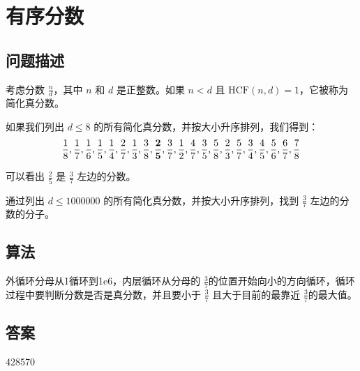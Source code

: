 \section{有序分数}\label{sec:problem71}
\subsection{问题描述}
\begin{tcolorbox}
考虑分数 \( \frac{n}{d} \)，其中 \( n \) 和 \( d \) 是正整数。如果 \( n < d \) 且 \( \text{HCF}(n, d) = 1 \)，它被称为简化真分数。

如果我们列出 \( d \leq 8 \) 的所有简化真分数，并按大小升序排列，我们得到：
\[ \frac{1}{8}, \frac{1}{7}, \frac{1}{6}, \frac{1}{5}, \frac{1}{4}, \frac{2}{7}, \frac{1}{3}, \frac{3}{8}, \frac{\bf
2}{\bf 5}, \frac{3}{7}, \frac{1}{2}, \frac{4}{7}, \frac{3}{5}, \frac{5}{8}, \frac{2}{3}, \frac{5}{7}, \frac{3}{4}, \frac{4}{5}, \frac{5}{6}, \frac{6}{7}, \frac{7}{8} \]

可以看出 \( \frac{2}{5} \) 是 \( \frac{3}{7} \) 左边的分数。

通过列出 \( d \leq 1000000 \) 的所有简化真分数，并按大小升序排列，找到 \( \frac{3}{7} \) 左边的分数的分子。

\end{tcolorbox}

\subsection{算法}
外循环分母从1循环到1e6，内层循环从分母的 \( \frac{3}{7}
\)的位置开始向小的方向循环，循环过程中要判断分数是否是真分数，并且要小于 \( \frac{3}{7} \) 且大于目前的最靠近 \(
\frac{3}{7} \)的最大值。


\subsection{答案}
428570
